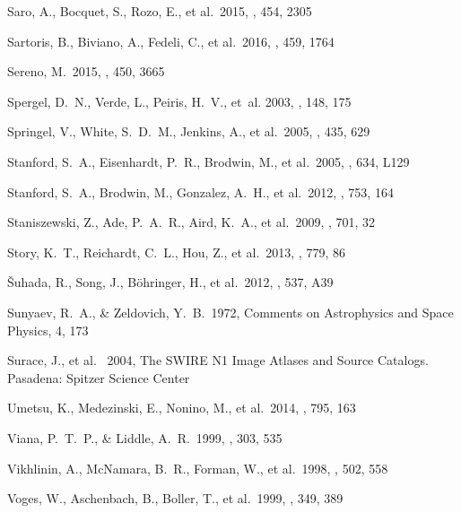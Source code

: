 \documentclass[apj,twocolumn]{emulateapj}
\begin{document}
{\begin{thebibliography}{88}
 Saro, A., Bocquet, S., Rozo, E., et al.\ 2015, \mnras, 454, 2305 

 Sartoris, B., Biviano, A., Fedeli, C., et al.\ 2016, \mnras, 459, 1764 

 Sereno, M.\ 2015, \mnras, 450, 3665 

 {Spergel}, D.~N., {Verde}, L., {Peiris}, H.~V., {et~al.} 2003, \apjs, 148, 175

 Springel, V., White, 
S.~D.~M., Jenkins, A., et al.\ 2005, \nat, 435, 629 

 Stanford, S.~A., 
Eisenhardt, P.~R., Brodwin, M., et al.\ 2005, \apjl, 634, L129 

 Stanford, S.~A.,  Brodwin, M., Gonzalez, A.~H., et al.\ 2012, \apj, 753, 164 

 Staniszewski, Z., Ade, P.~A.~R., Aird, K.~A., et al.\ 2009, \apj, 701, 32 

 Story, K.~T., Reichardt, C.~L., Hou, Z., et al.\ 2013, \apj, 779, 86 

 {\v S}uhada, R., Song, J., B{\"o}hringer, H., et al.\ 2012, \aap, 537, A39 

 Sunyaev, R.~A., \& Zeldovich, Y.~B.\ 1972, Comments on Astrophysics and Space Physics, 4, 173 

 Surace, J., et al. \ 2004, The SWIRE N1 Image Atlases and Source Catalogs. Pasadena: Spitzer Science Center

 Umetsu, K., Medezinski, E., Nonino, M., et al.\ 2014, \apj, 795, 163 

 Viana, P.~T.~P., \& Liddle, A.~R.\ 1999, \mnras, 303, 535 

 Vikhlinin, A., McNamara, B.~R., Forman, W., et al.\ 1998, \apj, 502, 558 

 Voges, W., Aschenbach, B., Boller, T., et al.\ 1999, \aap, 349, 389 


\end{thebibliography}}
\end{document}
